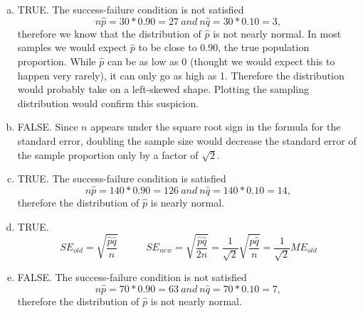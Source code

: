 {
{
\begin{enumerate}[(a)]
\item TRUE. The success-failure condition is not satisfied
\[ n\hat{p} = 30 * 0.90 = 27~and~ n\hat{q} = 30 * 0.10 = 3, \]
therefore we know that the distribution of $\hat{p}$ is not nearly normal. In most samples we would expect $\hat{p}$ to be close to 0.90, the true population proportion. While $\hat{p}$ can be as low as 0 (thought we would expect this to happen very rarely), it can only go as high as 1. Therefore the distribution would probably take on a left-skewed shape. Plotting the sampling distribution would confirm this suspicion.
\item FALSE.  Since $n$ appears under the square root sign in the formula for the standard error, doubling the sample size would decrease the standard error of the sample proportion only by a factor of $\sqrt{2}$.
\item TRUE. The success-failure condition is satisfied
\[ n\hat{p} = 140 * 0.90 = 126 ~and~ n\hat{q} = 140 * 0.10 = 14, \]
therefore the distribution of $\hat{p}$ is nearly normal.
\item TRUE. 
\[ SE_{old} =  \sqrt{\frac{\hat{p}\hat{q}}{n}} ~\hspace{1cm}~ SE_{new} = \sqrt{\frac{\hat{p}\hat{q}}{2n}} = \frac{1}{\sqrt{2}} \sqrt{\frac{\hat{p}\hat{q}}{n}} = \frac{1}{\sqrt{2}}ME_{old}\]
\item FALSE. The success-failure condition is not satisfied
\[ n\hat{p} = 70 * 0.90 = 63 ~and~ n\hat{q} = 70 * 0.10 = 7, \]
therefore the distribution of $\hat{p}$ is not nearly normal.
\end{enumerate}
}
}

